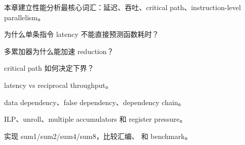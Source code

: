 {本章建立性能分析最核心词汇：延迟、吞吐、critical path、instruction-level parallelism。}
{\item 为什么单条指令 latency 不能直接预测函数耗时？
\item 多累加器为什么能加速 reduction？
\item critical path 如何决定下界？}
{\item latency vs reciprocal throughput。
\item data dependency、false dependency、dependency chain。
\item ILP、unroll、multiple accumulators 和 register pressure。}
{实现 sum1/sum2/sum4/sum8，比较汇编、 和 benchmark。}
